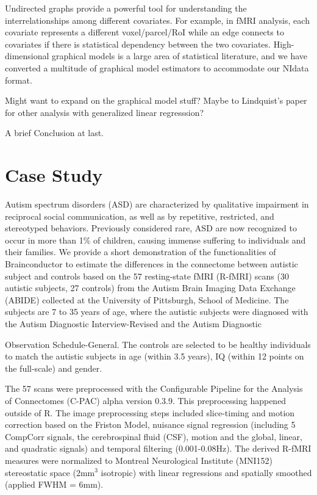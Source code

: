 \documentclass{nature}
\begin{document}
Undirected graphs provide a powerful tool for understanding the
interrelationships among
different covariates. For example, in fMRI analysis, each covariate represents 
a different voxel/parcel/RoI while an edge connects to covariates if there is
statistical dependency between the two covariates. High-dimensional graphical
models is a large area of statistical literature, and we have converted 
a multitude of graphical model estimators to accommodate our NIdata format.

{\color{red}Might want to expand on the graphical model stuff? Maybe to Lindquist's
paper for other analysis with generalized linear regresssion?}


{\color{red}A brief Conclusion at last.}

\section{Case Study}

Autism spectrum disorders (ASD) are characterized by qualitative impairment in
reciprocal social communication, as well as by repetitive, restricted, and
stereotyped behaviors. Previously considered rare, ASD are now recognized to
occur in more than 1\% of children, causing immense suffering to individuals and
their families. 
We provide a short demonstration of the functionalities of Brainconductor to
estimate the differences in the connectome between autistic subject and controls
based
on the 57 resting-state fMRI (R-fMRI) scans (30 autistic subjects, 27 controls)
from the Autism
Brain Imaging Data Exchange (ABIDE) collected at the 
University of Pittsburgh, School of Medicine\cite{di2014autism}. 
The subjects are 7 to 35 years of age, where the autistic subjects were
diagnosed with the Autism Diagnostic Interview-Revised and the Autism Diagnostic

Observation Schedule-General. The controls are selected to be healthy
individuals to match the autistic subjects in age (within 3.5 years), IQ (within
12 points on the full-scale) and gender.

The 57 scans were preprocessed with the Configurable Pipeline for the Analysis
of Connectomes (C-PAC) alpha version 0.3.9. This preprocessing 
happened outside of R. The image preprocessing steps
included slice-timing and motion correction based on the Friston Model, nuisance
signal
regression (including 5 CompCorr signals, the cerebrospinal fluid (CSF), motion
 and the global, linear, and quadratic
signals) and temporal filtering (0.001-0.08Hz). The derived R-fMRI measures
were normalized to Montreal Neurological Institute (MNI152) stereostatic
space (2mm$^3$ isotropic) with linear regressions and spatially smoothed
(applied FWHM = 6mm). 
\end{document}

